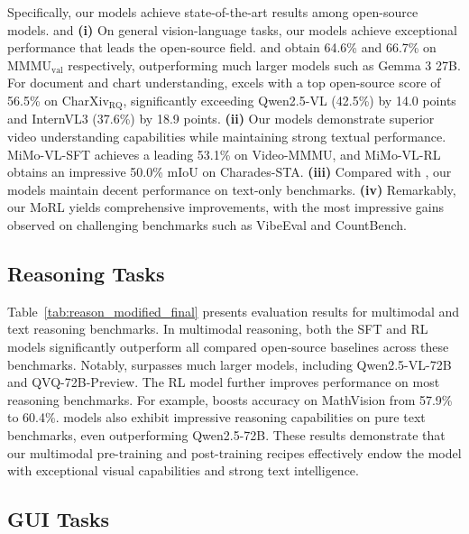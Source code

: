 Specifically, our \mimovl{} models achieve state-of-the-art results among open-source models. \mimovlsft{} and
\textbf{(i)} On general vision-language tasks, our models achieve exceptional performance that leads the open-source field. \mimovlsft{} and \mimovlrl{} obtain 64.6\% and 66.7\% on MMMU$_{\mathrm{val}}$ respectively, outperforming much larger models such as Gemma 3 27B. For document and chart understanding, \mimovlrl{} excels with a top open-source score of 56.5\% on CharXiv$_{\mathrm{RQ}}$, significantly exceeding Qwen2.5-VL (42.5\%) by 14.0 points and InternVL3 (37.6\%) by 18.9 points.
\textbf{(ii)} Our models demonstrate superior video understanding capabilities while maintaining strong textual performance. 
MiMo-VL-SFT achieves a leading 53.1\% on Video-MMMU, and MiMo-VL-RL obtains an impressive 50.0\% mIoU on Charades-STA. \textbf{(iii)} Compared with \mimo{}, our models maintain decent performance on text-only benchmarks.
\textbf{(iv)} Remarkably, our MoRL yields comprehensive improvements, with the most impressive gains observed on challenging benchmarks such as VibeEval and CountBench. 







\subsection{Reasoning Tasks}

Table~\ref{tab:reason_modified_final} presents evaluation results for multimodal and text reasoning benchmarks.
In multimodal reasoning, both the SFT and RL models significantly outperform all compared open-source baselines across these benchmarks.
Notably, \mimovlsft{} surpasses much larger models, including Qwen2.5-VL-72B and QVQ-72B-Preview.
The RL model further improves performance on most reasoning benchmarks.
For example, \mimovlrl{} boosts accuracy on MathVision from 57.9\% to 60.4\%.
\mimovl{} models also exhibit impressive reasoning capabilities on pure text benchmarks, even outperforming Qwen2.5-72B.
These results demonstrate that our multimodal pre-training and post-training recipes effectively endow the model with exceptional visual capabilities and strong text intelligence.





\subsection{GUI Tasks}

